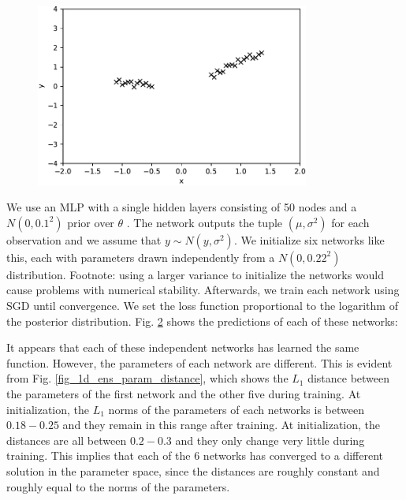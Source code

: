 \documentclass[12pt]{article}
\begin{document}
\begin{figure}[H]
\centering
\includegraphics[width=9cm]{plots/1d_dataset.pdf}
\caption{}
\label{fig_1d_dataset}
\end{figure}

We use an MLP with a single hidden layers consisting of 50 nodes and a $N(0, 0.1^2)$ prior over $\theta$ . The network outputs the tuple $(\mu, \sigma^2)$ for each observation and we assume that $y \sim N(y, \sigma^2)$. We initialize six networks like this, each with parameters drawn independently from a $N(0, 0.22^2)$ distribution. Footnote: using a larger variance to initialize the networks would cause problems with numerical stability. Afterwards, we train each network using SGD until convergence. We set the loss function proportional to the logarithm of the posterior distribution. Fig. \ref{fig_1d_ens_predictions} shows the predictions of each of these networks:

\begin{figure}[H]
\centering
{}
\caption{}
\label{fig_1d_ens_predictions}
\end{figure}

It appears that each of these independent networks has learned the same function. However, the parameters of each network are different. This is evident from Fig. \ref{fig_1d_ens_param_distance}, which shows the $L_1$ distance between the parameters of the first network and the other five during training. At initialization, the $L_1$ norms of the parameters of each networks is between $0.18 - 0.25$ and they remain in this range after training. At initialization, the distances are all between $0.2 - 0.3$ and they only change very little during training. This implies that each of the 6 networks has converged to a different solution in the parameter space, since the distances are roughly constant and roughly equal to the norms of the parameters.
\end{document}
